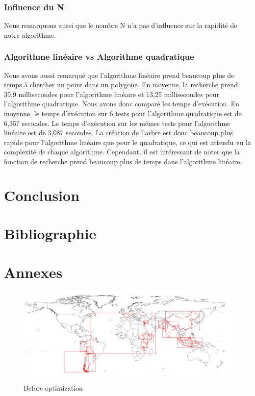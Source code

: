 \documentclass[utf8]{article}
\begin{document}
\begin{large}
  \subsubsection{Influence du N}
  Nous remarquons aussi que le
  nombre N n'a pas d'influence sur la rapidité de notre algorithme.
  \subsubsection{Algorithme linéaire vs Algorithme quadratique}
  \par
  \indent
  Nous avons aussi remarqué que l'algorithme linéaire prend beaucoup plus de temps
  à chercher un point dans un polygone. En moyenne, la recherche prend 39,9
  millisecondes pour l'algorithme linéaire et 13,25 millisecondes pour
  l'algorithme quadratique. Nous avons donc comparé les temps d'exécution. En
  moyenne, le temps d'exécution sur 6 tests pour l'algorithme quadratique est de
  6,357 secondes. Le temps d'exécution sur les mêmes tests pour l'algorithme
  linéaire est de 3,087 secondes. La création de l'arbre est donc beaucoup plus
  rapide pour l'algorithme linéaire que pour le quadratique, ce qui est attendu vu
  la complexité de chaque algorithme. Cependant, il est intéressant de noter que
  la fonction de recherche prend beaucoup plus de temps dans l'algorithme
  linéaire.
  \par

  \section{Conclusion}
  \indent
  \par
  \par

  \section{Bibliographie}

  \section{Annexes}
  \begin{figure}[h]
    \caption{Before optimization}\label{Figure 1}
    \includegraphics[width=\textwidth]{beforeopti.png}\label{fig:beforeopti}
  \end{figure}


\end{large}
\end{document}
